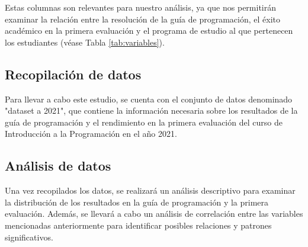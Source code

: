 Estas columnas son relevantes para nuestro análisis, ya que nos permitirán examinar la relación 
entre la resolución de la guía de programación, el éxito académico en la primera evaluación y 
el programa de estudio al que pertenecen los estudiantes (véase Tabla \ref{tab:variables}).



\subsection{Recopilación de datos}

Para llevar a cabo este estudio, se cuenta con el conjunto de datos denominado "dataset a 2021", que contiene la información necesaria sobre los
resultados de la guía de programación y el rendimiento en la primera evaluación del curso de Introducción a la Programación en el año 2021.


\subsection{Análisis de datos}

Una vez recopilados los datos, se realizará un análisis descriptivo para examinar la distribución de los resultados en la guía de programación y
la primera evaluación. Además, se llevará a cabo un análisis de correlación entre las variables mencionadas anteriormente para identificar posibles
relaciones y patrones significativos.

